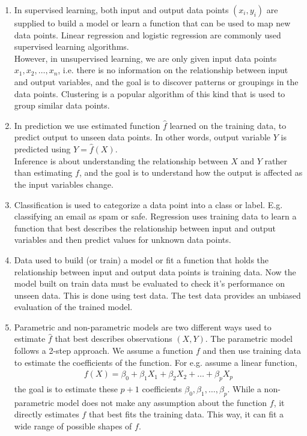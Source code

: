 \documentclass{article}[a4paper]
\begin{document}
\begin{enumerate}
    \item In supervised learning, both input and output data points $(x_i, y_i)$ are supplied to build a model or learn a function that can be used to map new data points. Linear regression and logistic regression are commonly used supervised learning algorithms. \\
    However, in unsupervised learning, we are only given input data points $x_1, x_2, \hdots, x_n$, i.e. there is no information on the relationship between input and output variables, and the goal is to discover patterns or groupings in the data points. Clustering is a popular algorithm of this kind that is used to group similar data points.
    \item In prediction we use estimated function $\hat{f}$ learned on the training data, to predict output to unseen data points. In other words, output variable $Y$ is predicted using $\hat{Y} = \hat{f}(X)$.\\
Inference is about understanding the relationship between $X$ and $Y$ rather than estimating $f$, and the goal is to understand how the output is affected as the input variables change.
    
    \item  Classification is used to categorize a data point into a class or label. E.g. classifying an email as spam or safe. Regression uses training data to learn a function that best describes the relationship between input and output variables and then predict values for unknown data points.
    \item Data used to build (or train) a model or fit a function that holds the relationship between input and output data points is training data. Now the model built on train data must be evaluated to check it's performance on unseen data. This is done using test data. The test data provides an unbiased evaluation of the trained model.
    \item Parametric and non-parametric models are two different ways used to estimate $\hat{f}$ that best describes observations $(X, Y)$. The parametric model follows a 2-step approach. We assume a function $f$ and then use training data to estimate the coefficients of the function. For e.g. assume a linear function,
    \begin{align*}
        f(X) = \beta_0 + \beta_1X_1 + \beta_2X_2 + \hdots + \beta_pX_p
    \end{align*}
    the goal is to estimate these $p+1$ coefficients $\beta_0, \beta_1, \hdots, \beta_p$.
    While a non-parametric model does not make any assumption about the function $f$, it directly estimates $f$ that best fits the training data. This way, it can fit a wide range of possible shapes of $f$.
\end{enumerate}




\end{document}
